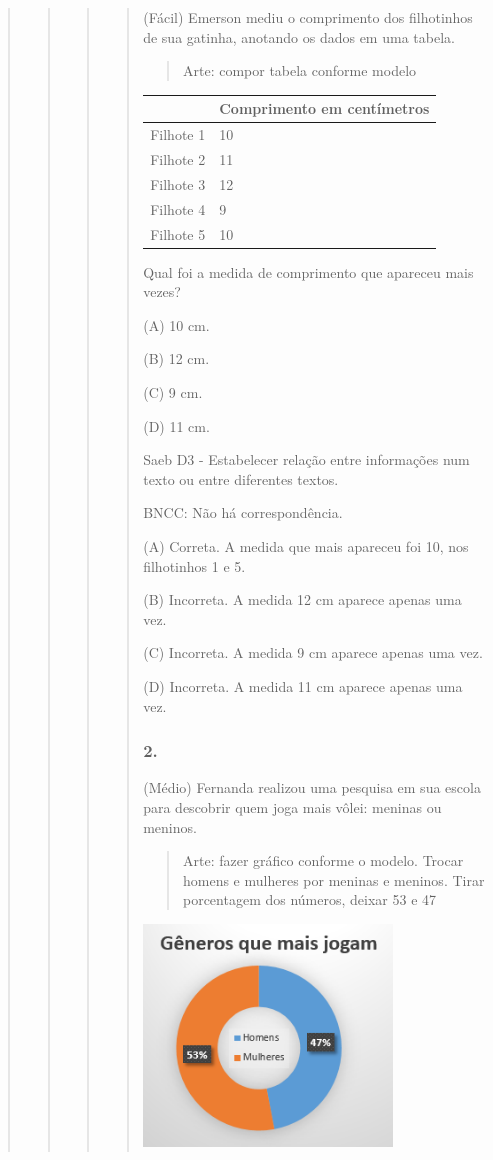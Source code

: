 \begin{quote}
\begin{quote}
\begin{quote}
\begin{quote}
(Fácil) Emerson mediu o comprimento dos filhotinhos de sua gatinha,
anotando os dados em uma tabela.

\begin{quote}
Arte: compor tabela conforme modelo
\end{quote}

\begin{longtable}[]{@{}ll@{}}
\toprule
& \textbf{Comprimento em centímetros}\tabularnewline
\midrule
\endhead
Filhote 1 & 10\tabularnewline
Filhote 2 & 11\tabularnewline
Filhote 3 & 12\tabularnewline
Filhote 4 & 9\tabularnewline
Filhote 5 & 10\tabularnewline
\bottomrule
\end{longtable}

Qual foi a medida de comprimento que apareceu mais vezes?

(A) 10 cm.

(B) 12 cm.

(C) 9 cm.

(D) 11 cm.

Saeb D3 - Estabelecer relação entre informações num texto ou entre
diferentes textos.

BNCC: Não há correspondência.

(A) Correta. A medida que mais apareceu foi 10, nos filhotinhos 1 e 5.

(B) Incorreta. A medida 12 cm aparece apenas uma vez.

(C) Incorreta. A medida 9 cm aparece apenas uma vez.

(D) Incorreta. A medida 11 cm aparece apenas uma vez.

\subsubsection{2. }\label{section-69}

(Médio) Fernanda realizou uma pesquisa em sua escola para descobrir quem
joga mais vôlei: meninas ou meninos.

\begin{quote}
Arte: fazer gráfico conforme o modelo. Trocar homens e mulheres por
meninas e meninos. Tirar porcentagem dos números, deixar 53 e 47
\end{quote}

\includegraphics[width=2.60244in,height=2.32558in]{media/image31.png}


\end{quote}
\end{quote}
\end{quote}
\end{quote}

